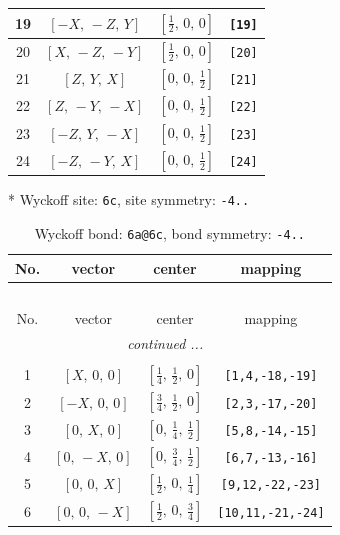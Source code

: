 \documentclass[fleqn,8pt]{jsarticle}
\begin{document}
\begin{longtable}{cccc}
19 & $\left[ - X,\, - Z,\, Y \right]$ & $\left[ \frac{1}{2},\, 0,\, 0 \right]$ & {\tt [19]} \\ \hline
20 & $\left[ X,\, - Z,\, - Y \right]$ & $\left[ \frac{1}{2},\, 0,\, 0 \right]$ & {\tt [20]} \\ \hline
21 & $\left[ Z,\, Y,\, X \right]$ & $\left[ 0,\, 0,\, \frac{1}{2} \right]$ & {\tt [21]} \\ \hline
22 & $\left[ Z,\, - Y,\, - X \right]$ & $\left[ 0,\, 0,\, \frac{1}{2} \right]$ & {\tt [22]} \\ \hline
23 & $\left[ - Z,\, Y,\, - X \right]$ & $\left[ 0,\, 0,\, \frac{1}{2} \right]$ & {\tt [23]} \\ \hline
24 & $\left[ - Z,\, - Y,\, X \right]$ & $\left[ 0,\, 0,\, \frac{1}{2} \right]$ & {\tt [24]} \\
\end{longtable}
* Wyckoff site: {\tt 6c}, site symmetry: {\tt -4..}
\renewcommand{\arraystretch}{1.2}
\begin{longtable}{cccc}
\caption{Wyckoff bond: {\tt 6a@6c}, bond symmetry: {\tt -4..}}
 \\
 \hline \hline
No. & vector & center & mapping \\ \hline \endfirsthead

\multicolumn{3}{l}{\tablename\ \thetable{}} \\
 \hline \hline
No. & vector & center & mapping \\ \hline \endhead

 \hline \hline
\multicolumn{3}{r}{\footnotesize\it continued ...} \\ \endfoot

 \hline \hline
\multicolumn{3}{r}{} \\ \endlastfoot

1 & $\left[ X,\, 0,\, 0 \right]$ & $\left[ \frac{1}{4},\, \frac{1}{2},\, 0 \right]$ & {\tt [1,4,-18,-19]} \\ \hline
2 & $\left[ - X,\, 0,\, 0 \right]$ & $\left[ \frac{3}{4},\, \frac{1}{2},\, 0 \right]$ & {\tt [2,3,-17,-20]} \\ \hline
3 & $\left[ 0,\, X,\, 0 \right]$ & $\left[ 0,\, \frac{1}{4},\, \frac{1}{2} \right]$ & {\tt [5,8,-14,-15]} \\ \hline
4 & $\left[ 0,\, - X,\, 0 \right]$ & $\left[ 0,\, \frac{3}{4},\, \frac{1}{2} \right]$ & {\tt [6,7,-13,-16]} \\ \hline
5 & $\left[ 0,\, 0,\, X \right]$ & $\left[ \frac{1}{2},\, 0,\, \frac{1}{4} \right]$ & {\tt [9,12,-22,-23]} \\ \hline
6 & $\left[ 0,\, 0,\, - X \right]$ & $\left[ \frac{1}{2},\, 0,\, \frac{3}{4} \right]$ & {\tt [10,11,-21,-24]} \\
\end{longtable}
\end{document}
